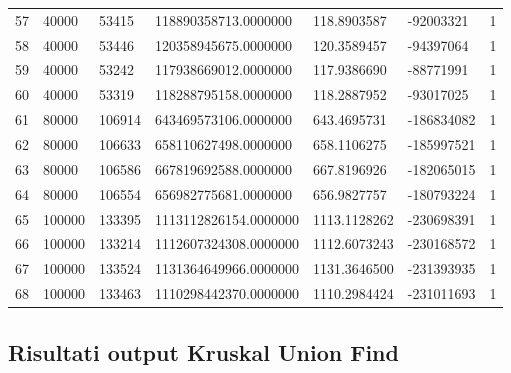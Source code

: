 \begin{longtable}{lllllll}
    57               & 40000          & 53415          & 118890358713.0000000  & 118.8903587      & -92003321       & 1                    \\
    58               & 40000          & 53446          & 120358945675.0000000  & 120.3589457      & -94397064       & 1                    \\
    59               & 40000          & 53242          & 117938669012.0000000  & 117.9386690      & -88771991       & 1                    \\
    60               & 40000          & 53319          & 118288795158.0000000  & 118.2887952      & -93017025       & 1                    \\
    61               & 80000          & 106914         & 643469573106.0000000  & 643.4695731      & -186834082      & 1                    \\
    62               & 80000          & 106633         & 658110627498.0000000  & 658.1106275      & -185997521      & 1                    \\
    63               & 80000          & 106586         & 667819692588.0000000  & 667.8196926      & -182065015      & 1                    \\
    64               & 80000          & 106554         & 656982775681.0000000  & 656.9827757      & -180793224      & 1                    \\
    65               & 100000         & 133395         & 1113112826154.0000000 & 1113.1128262     & -230698391      & 1                    \\
    66               & 100000         & 133214         & 1112607324308.0000000 & 1112.6073243     & -230168572      & 1                    \\
    67               & 100000         & 133524         & 1131364649966.0000000 & 1131.3646500     & -231393935      & 1                    \\
    68               & 100000         & 133463         & 1110298442370.0000000 & 1110.2984424     & -231011693      & 1                   
    \end{longtable}

\subsection{Risultati output Kruskal Union Find}

